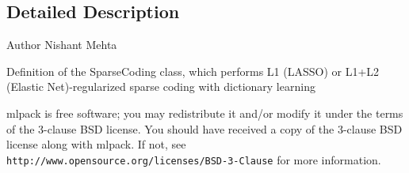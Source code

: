 \subsection{Detailed Description}
\begin{DoxyAuthor}{Author}
Nishant Mehta
\end{DoxyAuthor}
Definition of the Sparse\+Coding class, which performs L1 (L\+A\+S\+SO) or L1+\+L2 (Elastic Net)-\/regularized sparse coding with dictionary learning

mlpack is free software; you may redistribute it and/or modify it under the terms of the 3-\/clause B\+SD license. You should have received a copy of the 3-\/clause B\+SD license along with mlpack. If not, see {\tt http\+://www.\+opensource.\+org/licenses/\+B\+S\+D-\/3-\/\+Clause} for more information. 